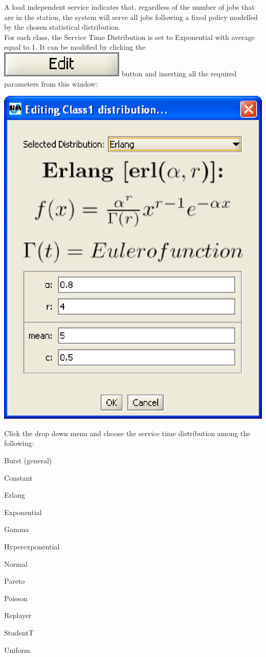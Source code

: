 A load independent service indicates that, regardless of the number of jobs that are in the station, the system will serve all jobs following a fixed policy modelled by the chosen statistical distribution.\\
For each class, the Service Time Distribution is set to Exponential with average equal to 1. It can be modified by clicking the  \includegraphics[scale=.5]{img/jsim/edit.eps} button and inserting all the required parameters from this window:
\begin{center}
\includegraphics[scale=.5]{img/jsim/erlang.eps}
\end{center}
Click the drop down menu and choose the service time distribution among the following:
\begin{itemize*}

\item Burst (general) \item Constant \item Erlang \item
Exponential \item Gamma \item Hyperexponential \item Normal \item
Pareto \item Poisson \item Replayer \item StudentT \item Uniform
\end{itemize*}
